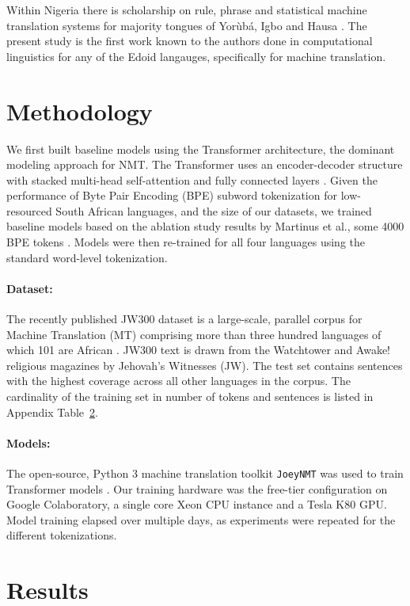 \documentclass{article} %
\begin{document}
Within Nigeria there is scholarship on rule, phrase and statistical machine translation systems for majority tongues of Yor{\`u}b{\'a}, Igbo and Hausa \citep{odojelanguage}. The present study is the first work known to the authors done in computational linguistics for any of the Edoid langauges, specifically for machine translation.


\section{Methodology}
\label{methods}

We first built baseline models using the Transformer architecture, the dominant modeling approach for NMT. The Transformer uses an encoder-decoder structure with stacked multi-head self-attention and fully connected layers \citep{NIPS2017_7181}. Given the performance of Byte Pair Encoding (BPE) subword tokenization for low-resourced South African languages, and the size of our datasets, we trained baseline models based on the ablation study results by Martinus et al., some 4000 BPE tokens \citep{focus_southafrica}. Models were then re-trained for all four languages using the standard word-level tokenization.

\paragraph{Dataset:} The recently published JW300 dataset is a large-scale, parallel corpus for Machine Translation (MT) comprising more than three hundred languages of which 101 are African \citep{agic-vulic-2019-jw300}. JW300 text is drawn from the Watchtower and Awake! religious magazines by Jehovah's Witnesses (JW). The test set contains sentences with the highest coverage across all other languages in the corpus. The cardinality of the training set in number of tokens and sentences is listed in Appendix Table~\ref{results}. 

\paragraph{Models:} The open-source, Python 3 machine translation toolkit \texttt{JoeyNMT} was used to train Transformer models \citep{JoeyNMT}. Our training hardware was the free-tier configuration on Google Colaboratory, a single core Xeon CPU instance and a Tesla K80 GPU. Model training elapsed over multiple days, as experiments were repeated for the different tokenizations.

\section{Results}
\label{results}
\end{document}
